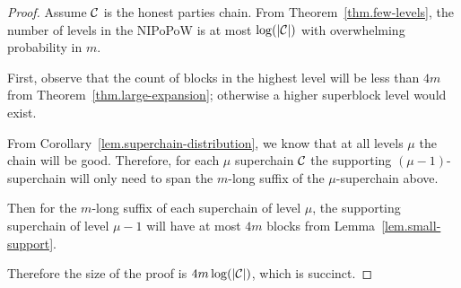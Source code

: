 \begin{proof}
    Assume $\mathcal{C}$ is the honest parties chain. From
    Theorem~\ref{thm.few-levels}, the number of levels in the NIPoPoW is at most
    $\log(|\mathcal{C}|)$ with overwhelming probability in $m$.

    First, observe that the count of blocks in the highest level will be less
    than $4m$ from Theorem~\ref{thm.large-expansion}; otherwise a higher
    superblock level would exist.

    From Corollary~\ref{lem.superchain-distribution}, we know that at all
    levels $\mu$ the chain will be good. Therefore, for each $\mu$ superchain
    $\mathcal{C}$ the supporting $(\mu - 1)$-superchain will only need to span the
    $m$-long suffix of the $\mu$-superchain above.

    Then for the $m$-long suffix of each superchain of level $\mu$, the
    supporting superchain of level $\mu - 1$ will have at most $4m$ blocks from
    Lemma~\ref{lem.small-support}.

    Therefore the size of the proof is $4m \log(|\mathcal{C}|)$, which is succinct.
    \Qed
\end{proof}
